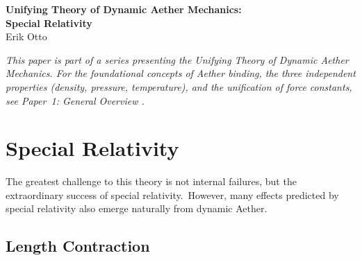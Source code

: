 ﻿\documentclass[12pt,letterpaper]{article}
\begin{document}
\begin{center}
{\LARGE\bfseries Unifying Theory of Dynamic Aether Mechanics:\\
Special Relativity}\\[1em]
{\large Erik Otto}
\end{center}

\vspace{1em}

\begin{abstract}
Within the Dynamic Aether Mechanics framework, special relativity emerges
naturally from the properties of a compressible quantum superfluid medium.  This
paper derives the Lorentz factor $\gamma = 1/\sqrt{1 - v^2/c^2}$ from geometric
path-length effects in the medium, time dilation from both velocity (path geometry)
and gravity (inflow-velocity-dependent time dilation), and mass--energy equivalence $E = mc^2$
from the compression wave energy of dissolving mass.  The five classical experiments
historically regarded as having disproved aether theories---Michelson--Morley,
Kennedy--Thorndike, Sagnac, stellar aberration, and Fizeau---are all quantitatively
predicted by the model.  The linearity of the medium's pressure--density response is
confirmed to $10^{-8}$ precision across velocities from $10^{-6}\,c$ to $0.9994c$.
\end{abstract}

\vspace{1em}

\bigskip
\noindent\textit{This paper is part of a series presenting the Unifying Theory of
Dynamic Aether Mechanics.  For the foundational concepts of Aether binding,
the three independent properties (density, pressure, temperature), and the
unification of force constants, see Paper~1: General Overview \cite{otto-overview}.}
\bigskip

\section{Special Relativity}
\label{sec:special-relativity}

The greatest challenge to this theory is not internal failures, but the extraordinary
success of special relativity.\ However, many effects predicted by special relativity also
emerge naturally from dynamic Aether.


\subsection{Length Contraction}
\end{document}
